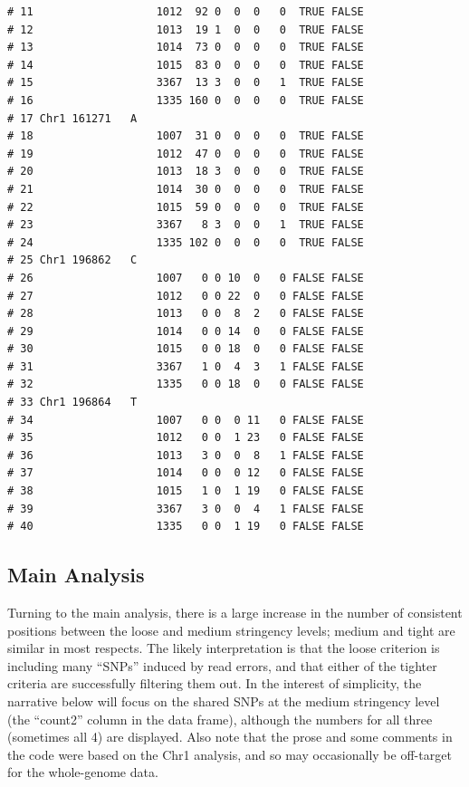 \documentclass{article}\usepackage[]{graphicx}\usepackage[]{color}
\makeatletter
\newenvironment{kframe}{%
 \def\at@end@of@kframe{}%
 \ifinner\ifhmode%
  \def\at@end@of@kframe{\end{minipage}}%
  \begin{minipage}{\columnwidth}%
 \fi\fi%
 \def\FrameCommand##1{\hskip\@totalleftmargin \hskip-\fboxsep
 \colorbox{shadecolor}{##1}\hskip-\fboxsep
     \hskip-\linewidth \hskip-\@totalleftmargin \hskip\columnwidth}%
 \MakeFramed {\advance\hsize-\width
   \@totalleftmargin\z@ \linewidth\hsize
   \@setminipage}}%
 {\par\unskip\endMakeFramed%
 \at@end@of@kframe}
\newenvironment{knitrout}{}{} %
\makeatother
\begin{document}
\begin{knitrout}
\begin{kframe}
\begin{verbatim}
# 11                   1012  92 0  0  0   0  TRUE FALSE        
# 12                   1013  19 1  0  0   0  TRUE FALSE        
# 13                   1014  73 0  0  0   0  TRUE FALSE        
# 14                   1015  83 0  0  0   0  TRUE FALSE        
# 15                   3367  13 3  0  0   1  TRUE FALSE        
# 16                   1335 160 0  0  0   0  TRUE FALSE        
# 17 Chr1 161271   A                                           
# 18                   1007  31 0  0  0   0  TRUE FALSE        
# 19                   1012  47 0  0  0   0  TRUE FALSE        
# 20                   1013  18 3  0  0   0  TRUE FALSE        
# 21                   1014  30 0  0  0   0  TRUE FALSE        
# 22                   1015  59 0  0  0   0  TRUE FALSE        
# 23                   3367   8 3  0  0   1  TRUE FALSE        
# 24                   1335 102 0  0  0   0  TRUE FALSE        
# 25 Chr1 196862   C                                           
# 26                   1007   0 0 10  0   0 FALSE FALSE        
# 27                   1012   0 0 22  0   0 FALSE FALSE        
# 28                   1013   0 0  8  2   0 FALSE FALSE        
# 29                   1014   0 0 14  0   0 FALSE FALSE        
# 30                   1015   0 0 18  0   0 FALSE FALSE        
# 31                   3367   1 0  4  3   1 FALSE FALSE        
# 32                   1335   0 0 18  0   0 FALSE FALSE        
# 33 Chr1 196864   T                                           
# 34                   1007   0 0  0 11   0 FALSE FALSE        
# 35                   1012   0 0  1 23   0 FALSE FALSE        
# 36                   1013   3 0  0  8   1 FALSE FALSE        
# 37                   1014   0 0  0 12   0 FALSE FALSE        
# 38                   1015   1 0  1 19   0 FALSE FALSE        
# 39                   3367   3 0  0  4   1 FALSE FALSE        
# 40                   1335   0 0  1 19   0 FALSE FALSE
\end{verbatim}
\end{kframe}
\end{knitrout}


\subsection{Main Analysis}
Turning to the main analysis, there is a large increase in the number of consistent positions between the loose and
medium stringency levels; medium and tight are similar in most respects.  The likely interpretation is that the loose
criterion is including many ``SNPs'' induced by read errors, and that either of the tighter criteria are successfully
filtering them out.  In the interest of simplicity, the narrative below will focus on the shared SNPs at the medium
stringency level (the ``count2'' column in the data frame), although the numbers for all three (sometimes all 4) are
displayed.  Also note that the prose and some comments in the code were based on the Chr1 analysis, and so may
occasionally be off-target for the whole-genome data.
\end{document}

